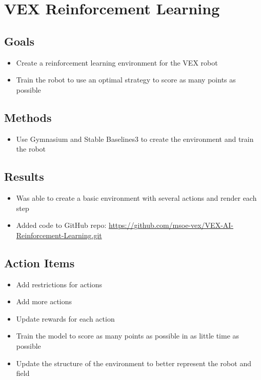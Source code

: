 \section{VEX Reinforcement Learning}

\subsection{Goals}
\begin{itemize}
    \item Create a reinforcement learning environment for the VEX robot
    \item Train the robot to use an optimal strategy to score as many points as possible
\end{itemize}

\subsection{Methods}
\begin{itemize}
    \item Use Gymnasium and Stable Baselines3 to create the environment and train the robot
\end{itemize}

\subsection{Results}
\begin{itemize}
    \item Was able to create a basic environment with several actions and render each step
    \item Added code to GitHub repo: \href{https://github.com/msoe-vex/VEX-AI-Reinforcement-Learning.git}{https://github.com/msoe-vex/VEX-AI-Reinforcement-Learning.git}
\end{itemize}

\subsection{Action Items}
\begin{itemize}
    \item Add restrictions for actions
    \item Add more actions
    \item Update rewards for each action
    \item Train the model to score as many points as possible in as little time as possible
    \item Update the structure of the environment to better represent the robot and field
\end{itemize}